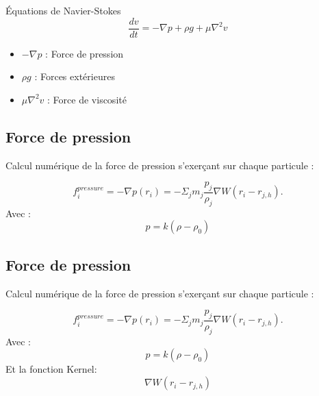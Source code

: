 \documentclass{article}
\begin{document}
\newpage
\vspace*{2pt}
\thispagestyle{landscape}
\begin{center}
    Équations de Navier-Stokes
    $$\frac{dv}{dt} = -\nabla p + \rho g + \mu \nabla ^2 v$$
\end{center}
\begin{itemize}
    \item $-\nabla p $ : Force de pression
    \item $ \rho g $ : Forces extérieures
    \item $\mu \nabla ^2 v$ : Force de viscosité
\end{itemize}





\newpage
\vspace*{2pt}
\thispagestyle{landscape}
\subsection{Force de pression}
Calcul numérique de la force de pression s’exerçant sur chaque particule :

$$ f^{pressure}_i = -\nabla p(r_i) = - \Sigma_j m_j \frac{p_j}{\rho_j} \nabla W(r_i-r_{j,h}).$$
Avec : 
$$p = k (\rho - \rho_0)$$

\newpage
\vspace*{2pt}
\thispagestyle{landscape}
\subsection{Force de pression}
Calcul numérique de la force de pression s’exerçant sur chaque particule :

$$ f^{pressure}_i = -\nabla p(r_i) = - \Sigma_j m_j \frac{p_j}{\rho_j} \nabla W(r_i-r_{j,h}).$$
Avec : 
$$p = k (\rho - \rho_0)$$
Et la fonction Kernel: 
$$\nabla W(r_i-r_{j,h})$$

\newpage
\vspace*{2pt}
\thispagestyle{landscape}
\end{document}
